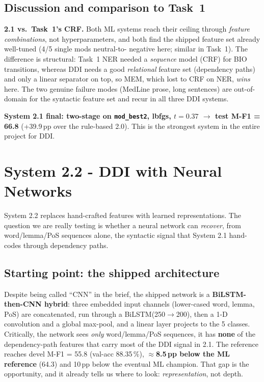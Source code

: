\documentclass[a4paper,11pt]{article}
\begin{document}
\subsection{Discussion and comparison to Task~1}
\begin{cmpbox}\small
\textbf{2.1 vs.\ Task~1's CRF.} Both ML systems reach their ceiling
through \emph{feature combinations}, not hyperparameters, and both find
the shipped feature set already well-tuned (4/5 single mods neutral-to-
negative here; similar in Task~1). The difference is structural: Task~1
NER needed a \emph{sequence} model (CRF) for BIO transitions, whereas
DDI needs a good \emph{relational} feature set (dependency paths) and
only a linear separator on top, so MEM, which lost to CRF on NER,
\emph{wins} here. The two genuine failure modes (MedLine prose, long
sentences) are out-of-domain for the syntactic feature set and recur in
all three DDI systems.
\end{cmpbox}

\noindent\textbf{System 2.1 final: two-stage on \texttt{mod\_best2},
lbfgs, $t{=}0.37$ $\to$ test M-F1 = 66.8} (+39.9\,pp over the rule-based
2.0). This is the strongest system in the entire project for DDI.

\section{System 2.2 - DDI with Neural Networks}\label{sec:nn}

System 2.2 replaces hand-crafted features with learned representations.
The question we are really testing is whether a neural network can
\emph{recover}, from word/lemma/PoS sequences alone, the syntactic
signal that System 2.1 hand-codes through dependency paths.

\subsection{Starting point: the shipped architecture}
Despite being called ``CNN'' in the brief, the shipped network is a
\textbf{BiLSTM-then-CNN hybrid}: three embedded input channels
(lower-cased word, lemma, PoS) are concatenated, run through a
BiLSTM(250$\to$200), then a 1-D convolution and a global max-pool, and a
linear layer projects to the 5 classes. Critically, the network sees
\emph{only} word/lemma/PoS sequences, it has \textbf{none} of the
dependency-path features that carry most of the DDI signal in 2.1. The
reference reaches devel M-F1 = 55.8 (val-acc 88.35\,\%),
\textbf{$\approx$8.5\,pp below the ML reference} (64.3) and 10\,pp below
the eventual ML champion. That gap is the opportunity, and it already
tells us where to look: \emph{representation}, not depth.
\end{document}
